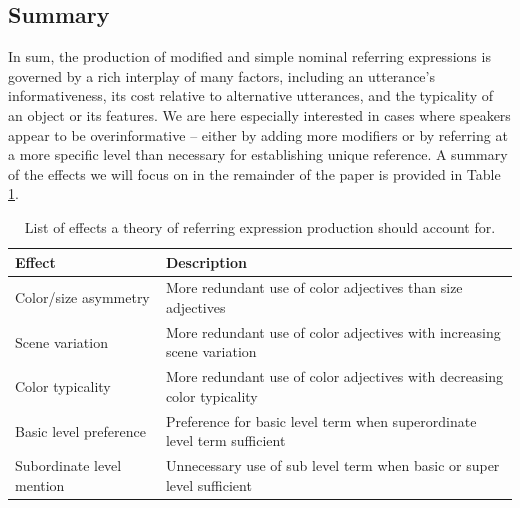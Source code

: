 \documentclass[11pt]{article}
\newcommand{\red}[1]{\textcolor{Red}{#1}}
\newcommand{\tableref}[1]{Table \ref{#1}}
\begin{document}
\subsection{Summary}
\label{sec:introsummary}

In sum, the production of modified and simple nominal referring expressions is governed by a rich interplay of many factors, including an utterance's informativeness, its cost relative to alternative utterances, and the typicality of an object or its features. We are here especially interested in cases where speakers appear to be overinformative -- either by adding more modifiers or by referring at a more specific level than necessary for establishing unique reference. A summary of the effects we will focus on in the remainder of the paper is provided in \tableref{tab:effects}.

\begin{table}
\caption{List of effects a theory of referring expression production should account for.}
\begin{tabular}{l l } %
\toprule
Effect & Description \\ %
\midrule
Color/size asymmetry & More redundant use of color adjectives than size adjectives \\ %
Scene variation & More redundant use of color adjectives with increasing scene variation \\ %
Color typicality & More redundant use of color adjectives with decreasing color typicality \\ %
\midrule
Basic level preference & Preference for basic level term when superordinate level term sufficient \\ %
Subordinate level mention & Unnecessary use of sub level term when basic or super level sufficient \\ %
\bottomrule
\end{tabular}
\label{tab:effects}
\end{table}
\end{document}

